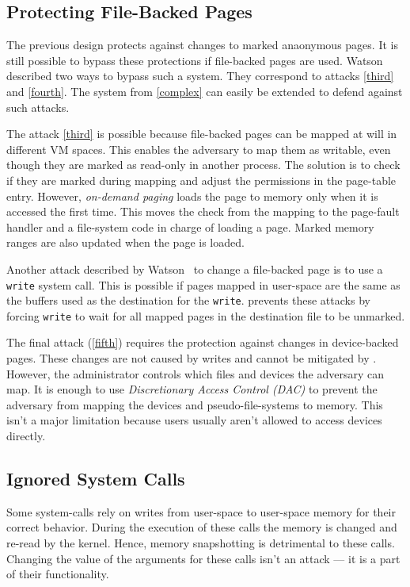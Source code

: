 \subsection{Protecting File-Backed Pages}
\label{subsec:fileprot}
The previous design protects against changes to marked anaonymous pages. It is
still possible to bypass these protections if file-backed pages are used.
Watson~\cite{watson2007exploiting} described two ways to bypass such a system.
They correspond to attacks \autoref{third} and \autoref{fourth}. The system from
\autoref{complex} can easily be extended to defend against such attacks.

The attack \autoref{third} is possible because file-backed pages can be mapped
at will in different VM spaces. This enables the adversary to map them as
writable, even though they are marked as read-only in another process. The 
solution is to check if they are marked during mapping and adjust the permissions
in the page-table entry. However, \emph{on-demand paging} loads the page to memory
only when it is accessed the first time. This moves the check from the mapping to
the page-fault handler and a file-system code in charge of loading a page. Marked
memory ranges are also updated when the page is loaded.

Another attack described by Watson~\cite{watson2007exploiting} to change a
file-backed page is to use a \texttt{write} system call. This is possible if
pages mapped in user-space are the same as the buffers used as the destination
for the \texttt{write}. \sysname prevents these attacks by forcing
\texttt{write} to wait for all mapped pages in the destination file to be
unmarked.

The final attack (\autoref{fifth}) requires the protection against changes in
device-backed pages. These changes are not caused by writes and cannot be
mitigated by \sysname. However, the administrator controls which files and
devices the adversary can map. It is enough to use \emph{Discretionary Access
Control (DAC)} to prevent the adversary from mapping the devices and
pseudo-file-systems to memory. This isn't a major limitation because users
usually aren't allowed to access devices directly.

\subsection{Ignored System Calls}
\label{subsec:ignoredcalls}

Some system-calls rely on writes from user-space to user-space memory for their
correct behavior. During the execution of these calls the memory is changed and
re-read by the kernel. Hence, memory snapshotting is detrimental to these calls.
Changing the value of the arguments for these calls isn't an attack --- it is a
part of their functionality.

